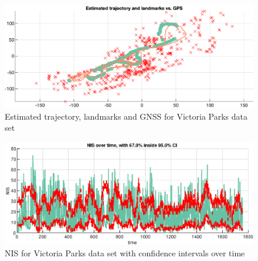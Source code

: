 \begin{figure}[!htb]
    \centering
    \includegraphics[width=0.8\linewidth]{figures/ga_3/real_trajectory.eps}
    \caption{Estimated trajectory, landmarks and GNSS for Victoria Parks data set}
    \label{fig:ga_3_real_trajectory}
\end{figure}

\begin{figure}[!htb]
    \centering
    \includegraphics[width=0.8\linewidth]{figures/ga_3/real_NIS.eps}
    \caption{NIS for Victoria Parks data set with confidence intervals over time}
    \label{fig:ga_3_real_NIS}
\end{figure}